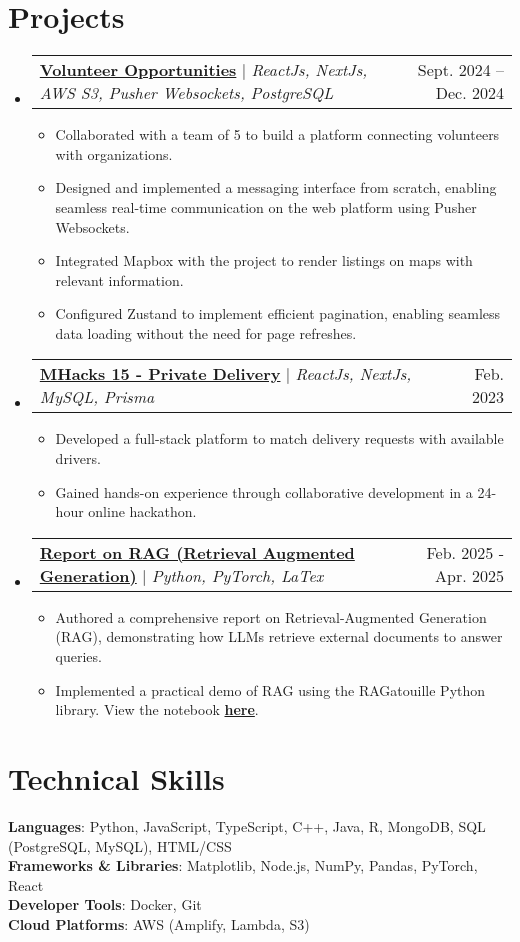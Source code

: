 \documentclass[letterpaper,11pt]{article}
\makeatletter
\newcommand{\resumeItem}[1]{
  \item\small{
    {#1 \vspace{-2pt}}
  }
}
\newcommand{\resumeProjectHeading}[2]{
    \item
    \begin{tabular*}{0.97\textwidth}{l@{\extracolsep{\fill}}r}
      \small#1 & #2 \\
    \end{tabular*}\vspace{-7pt}
}
\newcommand{\resumeSubHeadingListStart}{\begin{itemize}[leftmargin=0.15in, label={}]}
\newcommand{\resumeSubHeadingListEnd}{\end{itemize}}
\newcommand{\resumeItemListStart}{\begin{itemize}}
\newcommand{\resumeItemListEnd}{\end{itemize}\vspace{-5pt}}
\makeatother
\begin{document}
\section{Projects}
    \resumeSubHeadingListStart
      \resumeProjectHeading
          {\href{https://volunteer-opportunities.vercel.app/}{\color{Blue}\textbf{Volunteer Opportunities}} $|$ \emph{ReactJs, NextJs, AWS S3, Pusher Websockets, PostgreSQL}}{Sept. 2024 -- Dec. 2024}
          \resumeItemListStart
            \resumeItem{Collaborated with a team of 5 to build a platform connecting volunteers with organizations.}
            \resumeItem{Designed and implemented a messaging interface from scratch, enabling seamless real-time communication on the
 web platform using Pusher Websockets.}
            \resumeItem{Integrated Mapbox with the project to render listings on maps with relevant information.}
            \resumeItem{Configured Zustand to implement efficient pagination, enabling seamless data loading without the need for page
 refreshes.}
          \resumeItemListEnd
      \resumeProjectHeading
          {\href{https://devpost.com/software/privatedelivery/}{\color{Blue}\textbf{MHacks 15 - Private Delivery}} $|$ \emph{ReactJs, NextJs, MySQL, Prisma}}{Feb. 2023}
          \resumeItemListStart
            \resumeItem{Developed a full-stack platform to match delivery requests with available drivers.}
            \resumeItem{Gained hands-on experience through collaborative development in a 24-hour online hackathon.}
          \resumeItemListEnd
      \resumeProjectHeading
          {\href{https://github.com/SebastianNewberry/Final_Project_Intro_LLM/blob/main/Report.pdf}{\color{Blue}\textbf{Report on RAG (Retrieval Augmented Generation)}} $|$ \emph{Python, PyTorch, LaTex}}{Feb. 2025 - Apr. 2025}
          \resumeItemListStart
            \resumeItem{Authored a comprehensive report on Retrieval-Augmented Generation (RAG), demonstrating how LLMs retrieve external documents to answer queries.}
            \resumeItem{Implemented a practical demo of RAG using the RAGatouille Python library. View the notebook \href{https://colab.research.google.com/github/SebastianNewberry/Final_Project_Intro_LLM/blob/main/langchain_ollama_rag.ipynb}{\color{Blue}\textbf{here}}.}
          \resumeItemListEnd
    \resumeSubHeadingListEnd



%
\section{Technical Skills}
 \begin{itemize}[leftmargin=0.15in, label={}]
    \small{\item{
     \textbf{Languages}{: Python, JavaScript, TypeScript, C++, Java, R, MongoDB, SQL (PostgreSQL, MySQL), HTML/CSS} \\
     \textbf{Frameworks \& Libraries}{: Matplotlib, Node.js, NumPy, Pandas, PyTorch, React} \\
     \textbf{Developer Tools}{: Docker, Git} \\
     \textbf{Cloud Platforms}{: AWS (Amplify, Lambda, S3)}
    }}
 \end{itemize}


\end{document}

